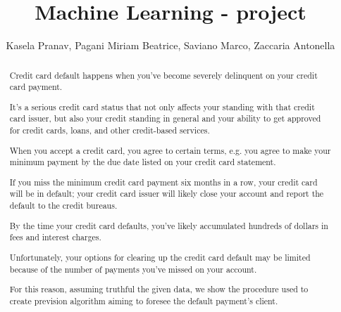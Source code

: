 \documentclass[11pt]{article}
\title{Machine Learning - project}
\author{Kasela Pranav, Pagani Miriam Beatrice, Saviano Marco, Zaccaria Antonella}
\date{}
\begin{document}
\maketitle



~\\ %
\begin{abstract}
	Credit card default happens when you've become severely delinquent on your credit card payment.

  It's a serious credit card status that not only affects your standing with that credit card issuer, but also your credit standing in general and your ability to get approved for credit cards, loans, and other credit-based services.
	
	When you accept a credit card, you agree to certain terms, e.g. you agree to make your minimum payment by the due date listed on your credit card statement.
	
	 If you miss the minimum credit card payment six months in a row, your credit card will be in default; your credit card issuer will likely close your account and report the default to the credit bureaus.
	
	By the time your credit card defaults, you've likely accumulated hundreds of dollars in fees and interest charges. 
	
	
    Unfortunately, your options for clearing up the credit card default may be limited because of the number of payments you've missed on your account. 
    
    For this reason, assuming truthful the given data, we show the procedure used to create prevision algorithm aiming to foresee the default payment's client.
    
    
\end{abstract}
\end{document}
